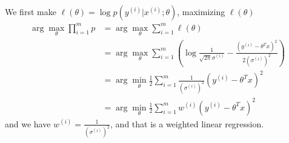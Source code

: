 \documentclass[11pt]{article}
\begin{document}
\begin{enumerate}[i.]
We first make $\ell(\theta) = \log p(y^{(i)} | x^{(i)}; \theta)$, maximizing $\ell(\theta)$
\begin{align*}
  \arg \max_{\theta} \prod_{i=1}^{m} p & = \arg \max_{\theta} \sum_{i=1}^{m}\ell({\theta})\\
  ~ & = \arg \max_{\theta} \sum_{i=1}^{m}\left( \log \frac{1}{\sqrt{2\pi}\sigma^{(i)}} - \frac{(y^{(i)}-\theta^Tx)^2}{2(\sigma^{(i)})^2}\right) \\
  ~ & = \arg \min_{\theta} \frac{1}{2}\sum_{i=1}^{m} \frac{1}{(\sigma^{(i)})^2}(y^{(i)}-\theta^Tx)^2\\
  ~ & = \arg \min_{\theta} \frac{1}{2}\sum_{i=1}^{m} w^{(i)}(y^{(i)}-\theta^Tx)^2
\end{align*}
and we have $w^{(i)} = \frac{1}{(\sigma^{(i)})^2}$, and that is a weighted linear regression.
\end{enumerate}
\end{document}
